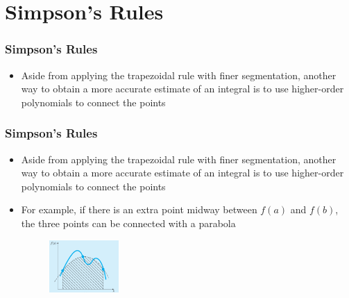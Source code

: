 \documentclass{if-beamer}
\begin{document}
\section{Simpson's Rules}

\begin{frame}[t]
	\frametitle{Simpson's Rules}
	\begin{itemize}
		\item Aside from applying the trapezoidal rule with finer segmentation, another way to obtain
		a more accurate estimate of an integral is to use higher-order polynomials to connect the
		points
		
	\end{itemize}
\end{frame}	
	

\begin{frame}[t]
	\frametitle{Simpson's Rules}
	\begin{itemize}
		\item Aside from applying the trapezoidal rule with finer segmentation, another way to obtain a more accurate estimate of an integral is to use higher-order polynomials to connect the
		points
		\item For example, if there is an extra point midway between $f(a)$ and $f(b)$, the three
		points can be connected with a parabola
		\begin{figure}
			\centering
			\includegraphics[width=0.25\textwidth]{figures/parab}
		\end{figure}
	\end{itemize}
\end{frame}	
\end{document}
